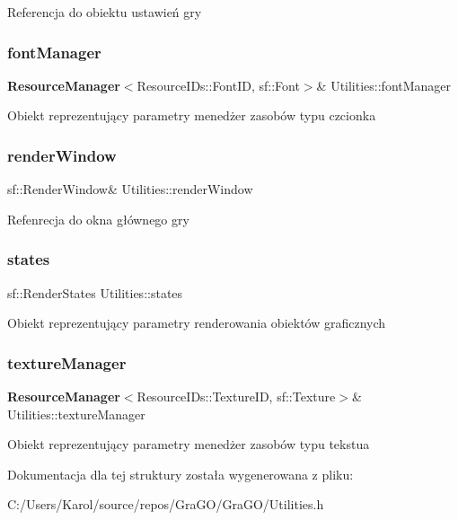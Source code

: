 Referencja do obiektu ustawień gry \mbox{\label{struct_utilities_ac36a832498367438968bd61f6d34298c}} 
\subsubsection{fontManager}
{\footnotesize\ttfamily \textbf{ Resource\+Manager}$<$Resource\+I\+Ds\+::\+Font\+ID, sf\+::\+Font$>$\& Utilities\+::font\+Manager}

Obiekt reprezentujący parametry menedżer zasobów typu czcionka \mbox{\label{struct_utilities_a009849590eb3cddcf69d3511fb1ef2f1}} 
\subsubsection{renderWindow}
{\footnotesize\ttfamily sf\+::\+Render\+Window\& Utilities\+::render\+Window}

Refenrecja do okna głównego gry \mbox{\label{struct_utilities_a60e8b0a7a0f8ce9cbbf5b20c81bb6cd6}} 
\subsubsection{states}
{\footnotesize\ttfamily sf\+::\+Render\+States Utilities\+::states}

Obiekt reprezentujący parametry renderowania obiektów graficznych \mbox{\label{struct_utilities_ae322073db616ebf323f9e23e7380082b}} 
\subsubsection{textureManager}
{\footnotesize\ttfamily \textbf{ Resource\+Manager}$<$Resource\+I\+Ds\+::\+Texture\+ID, sf\+::\+Texture$>$\& Utilities\+::texture\+Manager}

Obiekt reprezentujący parametry menedżer zasobów typu tekstua 

Dokumentacja dla tej struktury została wygenerowana z pliku\+:\begin{DoxyCompactItemize}
\item 
C\+:/\+Users/\+Karol/source/repos/\+Gra\+G\+O/\+Gra\+G\+O/Utilities.\+h\end{DoxyCompactItemize}

